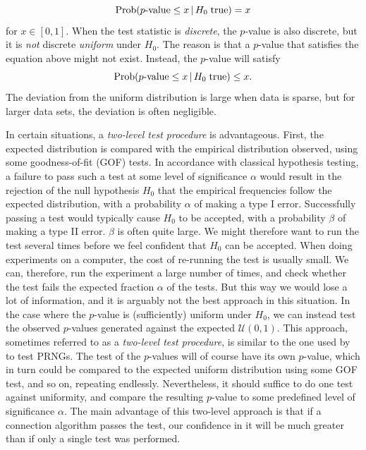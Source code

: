 \begin{equation}
\text{Prob}\!\left(\text{$p$-value} \le x\,|\,H_0 \;\text{true}\right) = x
\end{equation}
for $x \in [0,1]$. When the test statistic is \emph{discrete}, the $p$-value is also discrete, but it is \emph{not} discrete \emph{uniform} under $H_0$. The reason is that a $p$-value that satisfies the equation above might not exist. Instead, the $p$-value will satisfy 
\begin{equation}
\text{Prob}\!\left(\text{$p$-value} \le x\,|\,H_0 \;\text{true}\right) \le x.
\end{equation}
The deviation from the uniform distribution is large when data is sparse, but for larger data sets, the deviation is often negligible. 

In certain situations, a \emph{two-level test procedure} is advantageous. First, the expected distribution is compared with the empirical distribution observed, using some goodness-of-fit (GOF) tests. In accordance with classical hypothesis testing, a failure to pass such a test at some level of significance $\alpha$ would result in the rejection of the null hypothesis $H_0$ that the empirical frequencies follow the expected distribution, with a probability $\alpha$ of making a type I error. Successfully passing a test would typically cause $H_0$ to be accepted, with a probability $\beta$ of making a type II error. $\beta$ is often quite large. We might therefore want to run the test several times before we feel confident that $H_0$ can be accepted. When doing experiments on a computer, the cost of re-running the test is usually small. We can, therefore, run the experiment a large number of times, and check whether the test fails the expected fraction $\alpha$ of the tests. But this way we would lose a lot of information, and it is arguably not the best approach in this situation. In the case where the $p$-value is (sufficiently) uniform under $H_0$, we can instead test the observed $p$-values generated against the expected $\mathcal{U}(0, 1)$. This approach, sometimes referred to as a \emph{two-level test procedure}, is similar to the one used by  to test PRNGs. The test of the $p$-values will of course have its own $p$-value, which in turn could be compared to the expected uniform distribution using some GOF test, and so on, repeating endlessly. Nevertheless, it should suffice to do one test against uniformity, and compare the resulting $p$-value to some predefined level of significance $\alpha$. The main advantage of this two-level approach is that if a connection algorithm passes the test, our confidence in it will be much greater than if only a single test was performed. 


